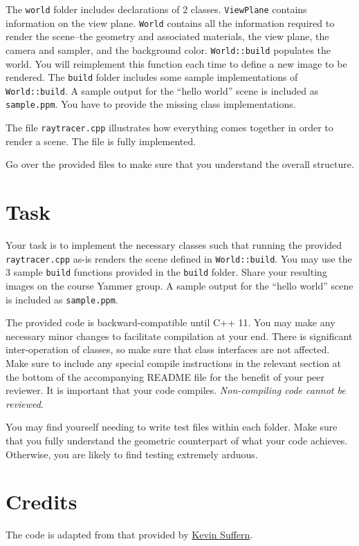 \documentclass{article}
\begin{document}
The \texttt{world} folder includes declarations of 2 classes. \texttt{ViewPlane} contains information on the view plane. \texttt{World} contains all the information required to render the scene--the geometry and associated materials, the view plane, the camera and sampler, and the background color. \texttt{World::build} populates the world. You will reimplement this function each time to define a new image to be rendered. The \texttt{build} folder includes some sample implementations of \texttt{World::build}. A sample output for the ``hello world'' scene is included as \texttt{sample.ppm}. You have to provide the missing class implementations.

The file \texttt{raytracer.cpp} illustrates how everything comes together in order to render a scene. The file is fully implemented.

Go over the provided files to make sure that you understand the overall structure.
  
\section*{Task}
Your task is to implement the necessary classes such that running the provided \texttt{raytracer.cpp} as-is renders the scene defined in \texttt{World::build}. You may use the 3 sample \texttt{build} functions provided in the \texttt{build} folder. Share your resulting images on the course Yammer group. A sample output for the ``hello world'' scene is included as \texttt{sample.ppm}.

The provided code is backward-compatible until C++ 11. You may make any necessary minor changes to facilitate compilation at your end. There is significant inter-operation of classes, so make sure that class interfaces are not affected. Make sure to include any special compile instructions in the relevant section at the bottom of the accompanying README file for the benefit of your peer reviewer. It is important that your code compiles. \textit{Non-compiling code cannot be reviewed}.

You may find yourself needing to write test files within each folder. Make sure that you fully understand the geometric counterpart of what your code achieves. Otherwise, you are likely to find testing extremely arduous.

\section*{Credits}

The code is adapted from that provided by \href{http://www.raytracegroundup.com/}{Kevin Suffern}.
\end{document}
